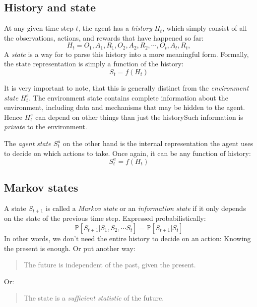 \documentclass[12pt, a4paper]{article}
\numberwithin{equation}{section}
\begin{document}
\subsection{History and state}
At any given time step $t$, the agent has a \textit{history} $H_t$, which simply consist of all the observations, actions, and rewards that have happened so far:
\begin{equation}
H_t=O_1,A_1,R_1,O_2,A_2,R_2,\cdots,O_t,A_t,R_t,
\end{equation}
A \textit{state} is a way for to parse this history into a more meaningful form. Formally, the state representation is simply a function of the history:
\begin{equation}
S_t=f(H_t)
\end{equation}

It is very important to note, that this is generally distinct from the \textit{environment state} $H^e_t$. The environment state contains complete information about the environment, including data and mechanisms that may be hidden to the agent. Hence $H^e_t$ can depend on other things than just the historySuch information is \textit{private} to the environment.

The \textit{agent state} $S^a_t$ on the other hand is the internal representation the agent uses to decide on which actions to take. Once again, it can be any function of history:
\begin{equation}
S^a_t=f(H_t)
\end{equation}

\subsection{Markov states}
A state $S_{t+1}$ is called a \textit{Markov state} or an \textit{information state} if it only depends on the state of the previous time step. Expressed probabilistically:
\begin{equation}
\mathbb{P}[S_{t+1}|S_1,S_2,\cdots S_t]=\mathbb{P}[S_{t+1}|S_t]
\end{equation}
In other words, we don't need the entire history to decide on an action: Knowing the present is enough. Or put another way:
\begin{quotation}
The future is independent of the past, given the present.
\end{quotation}
Or:
\begin{quotation}
The state is a \textit{sufficient statistic} of the future.
\end{quotation}
\end{document}
